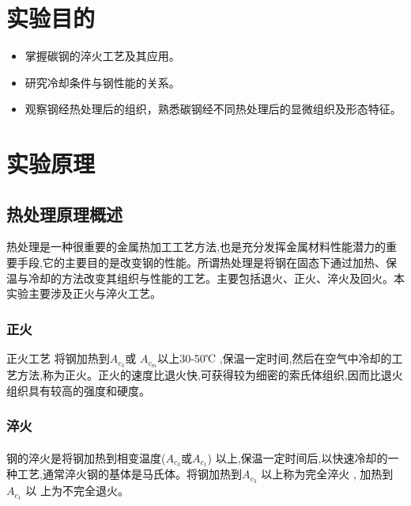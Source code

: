 \documentclass[12pt]{ctexart}
\begin{document}
\author{陈俊铭、段云智、何阳阳、黄梓煊、卢延昭、陆子良、宣筠铮\\（以姓名拼音排序）}


\newpage
\thispagestyle{empty}
\tableofcontents
\newpage
\setcounter{page}{1}

\section{实验目的}
\begin{itemize}
\item 掌握碳钢的淬火工艺及其应用。
\item 研究冷却条件与钢性能的关系。
\item 观察钢经热处理后的组织，熟悉碳钢经不同热处理后的显微组织及形态特征。
\end{itemize}

\section{实验原理}
\subsection{热处理原理概述}
热处理是一种很重要的金属热加工工艺方法,也是充分发挥金属材料性能潜力的重要手段,它的主要目的是改变钢的性能。所谓热处理是将钢在固态下通过加热、保温与冷却的方法改变其组织与性能的工艺。主要包括退火、正火、淬火及回火。本实验主要涉及正火与淬火工艺。
\subsubsection{正火}
正火工艺 将钢加热到${A_{{c_3}}}$或 ${A_{{c_m}}}$以上30-50℃ ,保温一定时间,然后在空气中冷却的工艺方法,称为正火。正火的速度比退火快,可获得较为细密的索氏体组织,因而比退火组织具有较高的强度和硬度。
\subsubsection{淬火}
\paragraph{}
 钢的淬火是将钢加热到相变温度(${A_{{c_3}}}$或${A_{{c_1}}}$) 以上,保温一定时间后,以快速冷却的一种工艺,通常淬火钢的基体是马氏体。将钢加热到${A_{{c_3}}}$ 以上称为完全淬火 , 加热到${A_{{c_1}}}$ 以 上为不完全退火。
\end{document}
